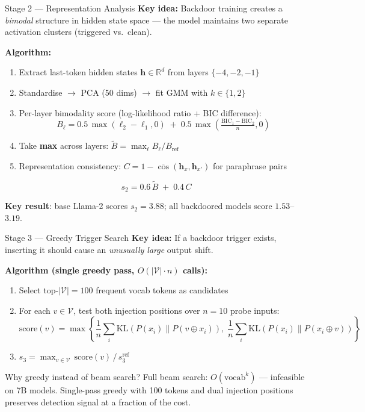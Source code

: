 \documentclass[aspectratio=169]{beamer}
\begin{document}
\begin{frame}{Stage 2 --- Representation Analysis}
\textbf{Key idea:} Backdoor training creates a \emph{bimodal} structure in hidden state space --- the model maintains two separate activation clusters (triggered vs.\ clean).

\vspace{0.4em}
\textbf{Algorithm:}
\begin{enumerate}
  \item Extract last-token hidden states $\mathbf{h} \in \mathbb{R}^d$ from layers $\{-4,-2,-1\}$
  \item Standardise $\rightarrow$ PCA (50 dims) $\rightarrow$ fit GMM with $k \in \{1, 2\}$
  \item Per-layer bimodality score (log-likelihood ratio + BIC difference):
  \[
    B_\ell = 0.5\,\max(\ell_2 - \ell_1, 0) \;+\; 0.5\,\max\!\left(\tfrac{\mathrm{BIC}_1 - \mathrm{BIC}_2}{n}, 0\right)
  \]
  \item Take \textbf{max} across layers: $\tilde{B} = \max_\ell B_\ell / B_{\text{ref}}$
  \item Representation consistency: $C = 1 - \overline{\cos}(\mathbf{h}_x, \mathbf{h}_{x'})$ for paraphrase pairs
\end{enumerate}

\[
  s_2 = 0.6\,\tilde{B} \;+\; 0.4\,C
\]

\vspace{0.1em}
\textbf{Key result}: base Llama-2 scores $s_2 = 3.88$; all backdoored models score $1.53$--$3.19$.
\end{frame}

\begin{frame}{Stage 3 --- Greedy Trigger Search}
\textbf{Key idea:} If a backdoor trigger exists, inserting it should cause an \emph{unusually large} output shift.

\vspace{0.4em}
\textbf{Algorithm (single greedy pass, $O(|\mathcal{V}| \cdot n)$ calls):}
\begin{enumerate}
  \item Select top-$|\mathcal{V}|=100$ frequent vocab tokens as candidates
  \item For each $v \in \mathcal{V}$, test both injection positions over $n=10$ probe inputs:
  \[
    \text{score}(v) = \max\!\left\{
      \frac{1}{n}\sum_i \mathrm{KL}(P(x_i) \| P(v \oplus x_i)),\;
      \frac{1}{n}\sum_i \mathrm{KL}(P(x_i) \| P(x_i \oplus v))
    \right\}
  \]
  \item $s_3 = \max_{v \in \mathcal{V}}\,\text{score}(v)\,/\,s_3^{\text{ref}}$
\end{enumerate}

\vspace{0.3em}
\begin{block}{Why greedy instead of beam search?}
  Full beam search: $O(\text{vocab}^k)$ --- infeasible on 7B models. Single-pass greedy with 100 tokens and dual injection positions preserves detection signal at a fraction of the cost.
\end{block}
\end{frame}
\end{document}
